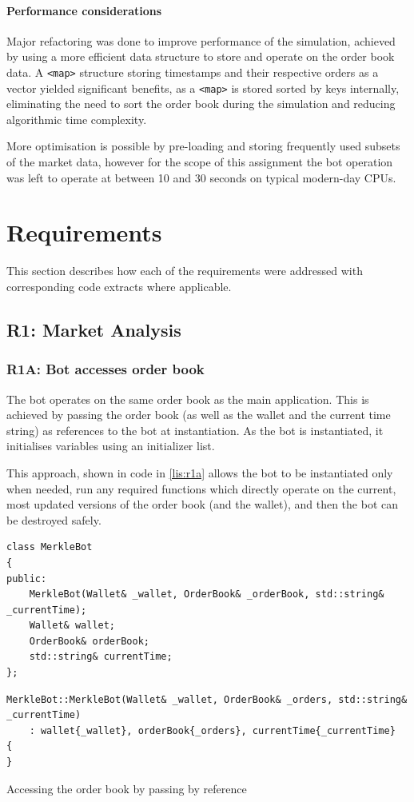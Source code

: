 \paragraph{Performance considerations} Major refactoring was done to improve performance of the simulation, achieved by using a more efficient data structure to store and operate on the order book data. A \texttt{<map>} structure storing timestamps and their respective orders as a vector yielded significant benefits, as a \texttt{<map>} is stored sorted by keys internally, eliminating the need to sort the order book during the simulation and reducing algorithmic time complexity.

More optimisation is possible by pre-loading and storing frequently used subsets of the market data, however for the scope of this assignment the bot operation was left to operate at between 10 and 30 seconds on typical modern-day CPUs. 

\section{Requirements}
This section describes how each of the requirements were addressed with corresponding code extracts where applicable.
\subsection{R1: Market Analysis}
\subsubsection{R1A: Bot accesses order book}
The bot operates on the same order book as the main application. This is achieved by passing the order book (as well as the wallet and the current time string) as references to the bot at instantiation. As the bot is instantiated, it initialises variables using an initializer list.

This approach, shown in code in \autoref{lis:r1a} allows the bot to be instantiated only when needed, run any required functions which directly operate on the current, most updated versions of the order book (and the wallet), and then the bot can be destroyed safely.

\begin{listing}[H]
	\begin{verbatim}
class MerkleBot
{
public:
	MerkleBot(Wallet& _wallet, OrderBook& _orderBook, std::string& _currentTime);
	Wallet& wallet;
	OrderBook& orderBook;
	std::string& currentTime;
};
\end{verbatim}

	\begin{verbatim}
MerkleBot::MerkleBot(Wallet& _wallet, OrderBook& _orders, std::string& _currentTime)
	: wallet{_wallet}, orderBook{_orders}, currentTime{_currentTime}
{
}
	\end{verbatim}
	\caption{Accessing the order book by passing by reference}
	\label{lis:r1a}
\end{listing}

